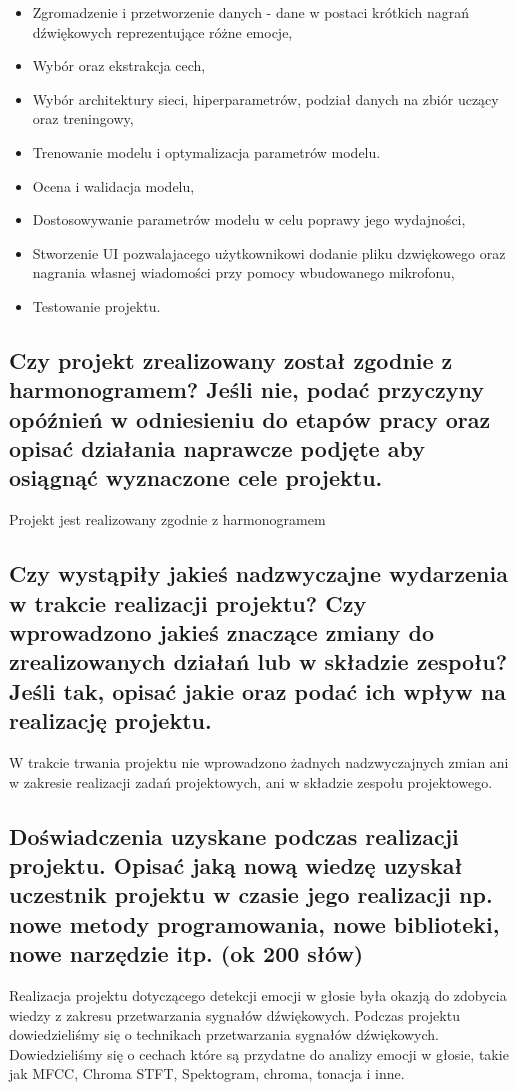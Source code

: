 \documentclass[12pt,titlepage]{article}
\begin{document}
\begin{itemize}
    \item Zgromadzenie i przetworzenie danych - dane w postaci krótkich nagrań dźwiękowych reprezentujące różne emocje,
    \item Wybór oraz ekstrakcja cech,
    \item Wybór architektury sieci, hiperparametrów, podział danych na zbiór uczący oraz treningowy,
    \item Trenowanie modelu i optymalizacja parametrów modelu.
    \item Ocena i walidacja modelu,
    \item Dostosowywanie parametrów modelu w celu poprawy jego wydajności,
    \item Stworzenie UI pozwalajacego użytkownikowi dodanie pliku dzwiękowego oraz nagrania własnej wiadomości przy pomocy wbudowanego mikrofonu,
    \item Testowanie projektu.
\end{itemize}

\subsection{Czy projekt zrealizowany został zgodnie z harmonogramem? Jeśli nie, podać przyczyny opóźnień w odniesieniu do etapów pracy oraz opisać działania naprawcze podjęte aby osiągnąć wyznaczone cele projektu.}
Projekt jest realizowany zgodnie z harmonogramem

\subsection{Czy wystąpiły jakieś nadzwyczajne wydarzenia w trakcie realizacji projektu? Czy wprowadzono jakieś znaczące zmiany do zrealizowanych działań lub w składzie zespołu? Jeśli tak, opisać jakie oraz podać ich wpływ na realizację projektu.}
W trakcie trwania projektu nie wprowadzono żadnych nadzwyczajnych zmian ani w zakresie realizacji zadań projektowych, ani w składzie zespołu projektowego.

\subsection{Doświadczenia uzyskane podczas realizacji projektu. Opisać jaką nową wiedzę uzyskał uczestnik projektu w czasie jego realizacji np. nowe metody programowania, nowe biblioteki, nowe narzędzie itp. (ok 200 słów)}
Realizacja projektu dotyczącego detekcji emocji w głosie była okazją do zdobycia wiedzy z zakresu przetwarzania sygnałów dźwiękowych. Podczas projektu dowiedzieliśmy się o technikach przetwarzania sygnałów dźwiękowych. Dowiedzieliśmy się o cechach które są przydatne do analizy emocji w głosie, takie jak MFCC, Chroma STFT, Spektogram, chroma, tonacja i inne.
\end{document}
